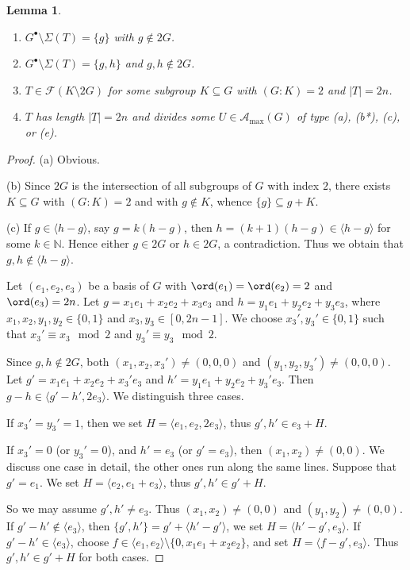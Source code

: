 \documentclass[a4paper, 10pt]{amsart}
\theoremstyle{plain}
\newtheorem{lemma}[theorem]{\bf Lemma}
\theoremstyle{definition}
\newcommand{\N}{\mathbb N}
\numberwithin{equation}{section}
\begin{document}
{\begin{lemma}
\begin{enumerate}
		\item[(b)] $G^{\bullet} \setminus \Sigma (T) = \{g\}$ with $g\notin 2G$.
		
		\item[(c)] $G^{\bullet}\setminus \Sigma (T)=\{g,h\}$ and $g,h\notin 2G$.
		
		\item[(d)] $T \in \mathcal F (K\setminus 2G)$ for some subgroup $K \subseteq G$ with $(G \colon K)=2$ and $|T|=2n$.

        \item[(e)] $T$ has length $|T|=2n$ and divides  some $U\in\mathcal A_{\max}(G)$ of type (a), (b*), (c), or (e).
	\end{enumerate}
\end{lemma}

\begin{proof}
	(a) Obvious.
	
	(b) Since $2G$ is the intersection of all subgroups of $G$ with index $2$, there exists $K \subseteq G$ with $(G : K)=2$ and with $g\notin K$, whence $\{g\}\subseteq g+K$.
	
	(c) If $g\in \langle h-g \rangle$, say $g=k(h-g)$, then $h=(k+1)(h-g)\in\langle h-g\rangle$ for some $k\in\N$. Hence either $g\in2G$ or $h\in2G$, a contradiction. Thus we obtain that $g,h\notin\langle h-g\rangle$.
	
	Let $(e_1, e_2, e_3)$ be a basis of $G$ with $\ord (e_1)=\ord (e_2)=2$ and $\ord (e_3) = 2n$. Let $g=x_1e_1+x_2e_2+x_3e_3$ and $h=y_1e_1+y_2e_2+y_3e_3$, where $x_1,x_2,y_1,y_2\in \{0,1\}$ and $x_3,y_3\in [0,2n-1]$. We choose $x_3',y_3'\in\{0,1\}$ such that $x_3'\equiv x_3\mod 2$ and $y_3'\equiv y_3\mod 2$.
	
	Since $g,h\notin 2G$, both $(x_1,x_2,x_3')\ne (0,0,0)$ and $(y_1,y_2,y_3')\ne (0,0,0)$. Let $g'=x_1e_1+x_2e_2+x_3'e_3$ and $h'=y_1e_1+y_2e_2+y_3'e_3$. Then $g-h\in \langle g'-h',2e_3 \rangle$. We distinguish three cases.
	
	If $x_3'=y_3'=1$, then we set $H= \langle e_1,e_2,2e_3 \rangle$, thus $g',h'\in e_3+ H$.
	
	If $x_3'=0$ (or $y_3'=0$), and $h'=e_3$ (or $g'=e_3$), then $(x_1,x_2)\ne (0,0)$. We discuss one case in detail, the other ones run along the same lines. Suppose that $g'=e_1$. We set $H= \langle e_2,e_1+e_3 \rangle$, thus $g',h'\in g'+ H$.
	
	So we may assume $g',h'\ne e_3$. Thus $(x_1,x_2)\ne (0,0)$ and $(y_1,y_2)\ne (0,0)$. If $g'- h'\notin \langle e_3 \rangle$, then $\{g',h'\}= g'+\langle h'-g' \rangle$, we set $H=\langle h'-g',e_3 \rangle$. If $g'-h'\in \langle e_3 \rangle$, choose $f\in \langle e_1,e_2 \rangle \setminus \{0,x_1e_1+x_2e_2\}$, and set $H=\langle f-g',e_3 \rangle$. Thus $g',h'\in g'+ H$ for both cases.
	

\end{proof}}
\end{document}

